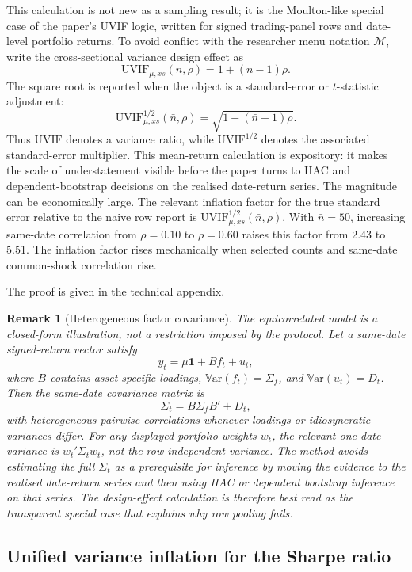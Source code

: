 \documentclass[12pt,a4paper]{article}
\newtheorem{remark}{Remark}
\newcommand{\Var}{\mathbb{V}\mathrm{ar}}
\newcommand{\UVIF}{\mathrm{UVIF}}
\begin{document}
This calculation is not new as a sampling result; it is the
Moulton-like special case of the paper's UVIF logic, written for signed
trading-panel rows and date-level portfolio returns.  To avoid conflict
with the researcher menu notation \(\mathcal M\), write the
cross-sectional variance design effect as
\[
  \UVIF_{\mu,xs}(\bar n,\rho)=1+(\bar n-1)\rho.
\]
The square root is reported when the object is a standard-error or
\(t\)-statistic adjustment:
\[
  \UVIF_{\mu,xs}^{1/2}(\bar n,\rho)=
  \sqrt{1+(\bar n-1)\rho}.
\]
Thus \(\UVIF\) denotes a variance ratio, while \(\UVIF^{1/2}\) denotes
the associated standard-error multiplier.  This mean-return calculation
is expository: it makes the scale of understatement visible before the
paper turns to HAC and dependent-bootstrap decisions on the realised date-return
series.
The magnitude can be economically large.  The relevant inflation factor
for the true standard error relative to the naive row report is
\(\UVIF_{\mu,xs}^{1/2}(\bar n,\rho)\).  With \(\bar n=50\), increasing same-date
correlation from \(\rho=0.10\) to \(\rho=0.60\) raises this factor from
2.43 to 5.51.  The inflation factor rises mechanically when selected
counts and same-date common-shock correlation rise.

\noindent The proof is given in the technical appendix.

\begin{remark}[Heterogeneous factor covariance]
The equicorrelated model is a closed-form illustration, not a restriction
imposed by the protocol.  Let a same-date signed-return vector satisfy
\[
  y_t=\mu\mathbf 1 + B f_t + u_t,
\]
where \(B\) contains asset-specific loadings, \(\Var(f_t)=\Sigma_f\),
and \(\Var(u_t)=D_t\).  Then the same-date covariance matrix is
\[
  \Sigma_t = B\Sigma_f B' + D_t,
\]
with heterogeneous pairwise correlations whenever loadings or
idiosyncratic variances differ.  For any displayed portfolio weights
\(w_t\), the relevant one-date variance is \(w_t'\Sigma_t w_t\), not the
row-independent variance.  The method avoids estimating the full
\(\Sigma_t\) as a prerequisite for inference by moving the evidence to
the realised date-return series and then using HAC or dependent
bootstrap inference on that series.  The design-effect calculation is therefore best read
as the transparent special case that explains why row pooling fails.
\end{remark}

\subsection{Unified variance inflation for the Sharpe ratio}
\end{document}
